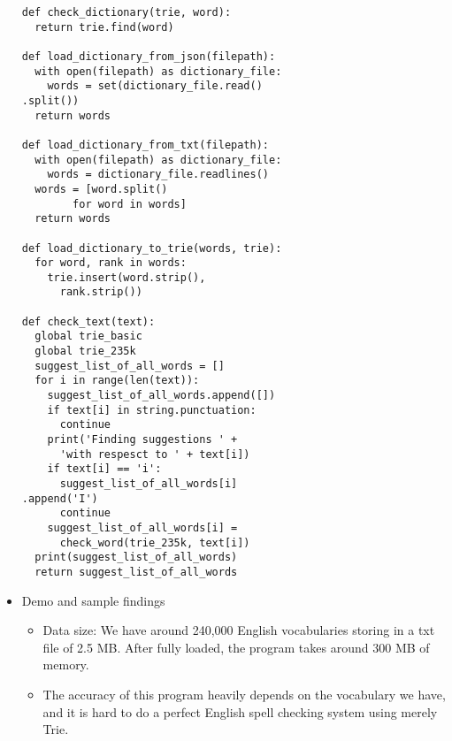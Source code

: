 \begin{itemize}
\begin{verbatim}
def check_dictionary(trie, word):
  return trie.find(word)

def load_dictionary_from_json(filepath):
  with open(filepath) as dictionary_file:
    words = set(dictionary_file.read()
.split())
  return words

def load_dictionary_from_txt(filepath):
  with open(filepath) as dictionary_file:
    words = dictionary_file.readlines()
  words = [word.split() 
        for word in words]
  return words

def load_dictionary_to_trie(words, trie):
  for word, rank in words:
    trie.insert(word.strip(), 
      rank.strip())

def check_text(text):
  global trie_basic
  global trie_235k
  suggest_list_of_all_words = []
  for i in range(len(text)):
    suggest_list_of_all_words.append([])
    if text[i] in string.punctuation:
      continue
    print('Finding suggestions ' +
      'with respesct to ' + text[i])
    if text[i] == 'i':
      suggest_list_of_all_words[i]
.append('I')
      continue
    suggest_list_of_all_words[i] = 
      check_word(trie_235k, text[i])
  print(suggest_list_of_all_words)
  return suggest_list_of_all_words
\end{verbatim}
\item{}
Demo and sample findings
\begin{itemize} 
\item{}
	Data size: We have around 240,000 English vocabularies storing in a txt file of 2.5 MB. After fully loaded, the program takes around 300 MB of memory.
\item{}
	The accuracy of this program heavily depends on the vocabulary we have, and it is hard to do a perfect English spell checking system using merely Trie.
\end{itemize}
\end{itemize}

